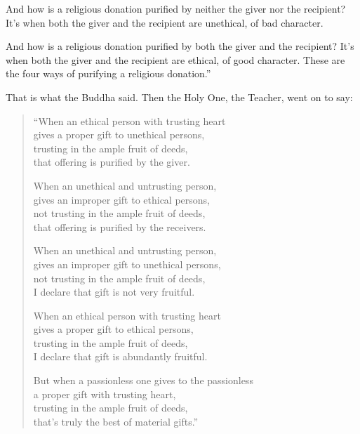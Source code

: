 \documentclass[12pt,openany]{book}%
\let\oldcontentsline\contentsline
\newcommand{\nopagecontentsline}[3]{\oldcontentsline{#1}{#2}{}}
\begin{document}
And how is a religious donation purified by neither the giver nor the recipient? It’s when both the giver and the recipient are unethical, of bad character. 

And how is a religious donation purified by both the giver and the recipient? It’s when both the giver and the recipient are ethical, of good character. These are the four ways of purifying a religious donation.” 

That is what the Buddha said. Then the Holy One, the Teacher, went on to say: 

\begin{verse}%
“When an ethical person with trusting heart \\
gives a proper gift to unethical persons, \\
trusting in the ample fruit of deeds, \\
that offering is purified by the giver. 

When an unethical and untrusting person, \\
gives an improper gift to ethical persons, \\
not trusting in the ample fruit of deeds, \\
that offering is purified by the receivers. 

When an unethical and untrusting person, \\
gives an improper gift to unethical persons, \\
not trusting in the ample fruit of deeds, \\
I declare that gift is not very fruitful. 

When an ethical person with trusting heart \\
gives a proper gift to ethical persons, \\
trusting in the ample fruit of deeds, \\
I declare that gift is abundantly fruitful. 

But when a passionless one gives to the passionless \\
a proper gift with trusting heart, \\
trusting in the ample fruit of deeds, \\
that’s truly the best of material gifts.” 

%
\end{verse}

%
\end{document}
